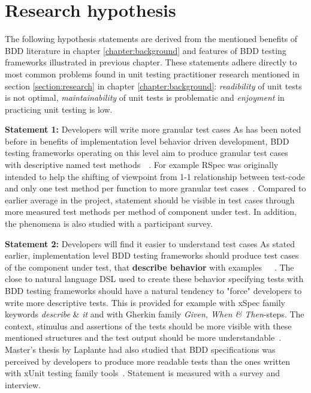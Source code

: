 \section{Research hypothesis} %
    The following hypothesis statements are derived from the mentioned benefits of BDD literature in chapter \ref{chapter:background} and features of BDD
    testing frameworks illustrated in previous chapter. These statements adhere directly to most common problems found in unit
    testing practitioner research mentioned in section \ref{section:research} in chapter \ref{chapter:background}:
    \textit{readibility} of unit tests is not optimal, \textit{maintainability} of unit tests is problematic and \textit{enjoyment}
    in practicing unit testing is low.
    \begin{addmargin}[0em]{0em}
    \vspace{10px}
    \textbf{Statement 1:} Developers will write more granular test cases
    \vspace{5px}
    \newline
    As has been noted before in benefits of implementation level behavior driven development, BDD testing frameworks operating on this
    level aim to produce granular test cases with descriptive named test methods~\cite{chelimsky2010rspec}~\cite{astels2006new}.
    For example RSpec was originally intended to help the shifting of viewpoint from 1-1 relationship between test-code
    and only one test method per function to more granular test cases~\cite{astels2006new}.
    Compared to earlier average in the project, statement should be visible in test cases through more measured test methods
    per method of component under test. In addition, the phenomena is also studied with a participant survey.
    \end{addmargin}

    \begin{addmargin}[0em]{0em}
    \vspace{10px}
    \textbf{Statement 2:} Developers will find it easier to understand test cases
    \vspace{5px}
    \newline
    As stated earlier, implementation level BDD testing frameworks should produce test cases of the component under test,
    that \textbf{describe behavior} with examples~\cite{chelimsky2010rspec}~\cite{astels2006new}~\cite{amodeo2015learning}.
    The close to natural language DSL used to create these behavior specifying tests with BDD testing frameworks should
    have a natural tendency to "force" developers to write more descriptive tests. This is provided for example
    with xSpec family keywords \textit{describe} \& \textit{it} and with Gherkin family \textit{Given, When \& Then}-steps.
    The context, stimulus and assertions of the tests should be more visible with these mentioned structures and the test output
    should be more understandable~\cite{smart2014bdd}. Master's thesis by Laplante had also studied that BDD specifications
    was perceived by developers to produce more readable tests than the ones written with xUnit testing family tools~\cite{laplante2009behavior}.
    Statement is measured with a survey and interview.
    \end{addmargin}


